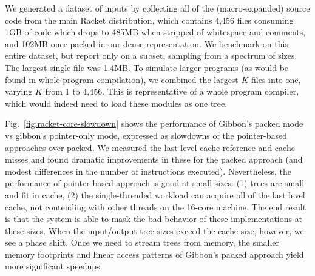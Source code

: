\documentclass[showabstract,showacknowledgments,showpreface,showdedication,school]{iuphd}
\theoremstyle{nonumberplain}
\newcommand{\figref}[1]{Fig.~\ref{#1}}
\begin{document}
We generated a dataset of inputs by collecting all of the (macro-expanded) source
code from the main Racket distribution, which contains 4,456 files consuming
1GB of code which drops to 485MB when stripped of whitespace and comments, and
102MB once packed in our dense representation.
We benchmark on this entire dataset, but report only on a subset, sampling from
a spectrum of sizes.
The largest single file was 1.4MB.
To simulate larger programs (as would be found in whole-program compilation), we
combined the largest $K$ files into one, varying $K$ from 1 to 4,456.
This is representative of a whole program compiler, which would indeed need to
load these modules as one tree.

\figref{fig:racket-core-slowdown} shows the performance of Gibbon's packed mode vs gibbon's
pointer-only mode, expressed as slowdowns of the pointer-based approaches over
packed. We measured the last level cache reference and cache misses and found
dramatic improvements in these for the packed approach (and modest differences
in the number of instructions executed).
Nevertheless, the performance of pointer-based
approach is good at small sizes: (1) trees are small and fit in cache, (2) the
single-threaded workload can acquire all of the last level cache, not contending
with other threads on the 16-core machine. The end result is that the system is
able to mask the bad behavior of these implementations at these sizes.
When the input/output tree sizes exceed the cache size, however, we see a phase
shift. Once we need to stream trees from memory, the smaller memory footprints
and linear access patterns of Gibbon's packed approach yield more significant
speedups.
\end{document}
